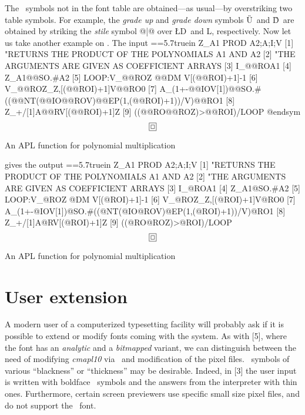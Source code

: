 The \APL\ symbols not in the font table are obtained---as usual---by
overstriking two table symbols.
%
\begintt
   \newbox\firstchar\newskip\charwidth
   \def\overstrike#1#2{\setbox\firstchar=\hbox{#1}\charwidth=\wd\firstchar
                       #1\hskip-\charwidth#2}
\endtt
{}%
For example, the {\it grade up\/} and {\it grade down\/} symbols
\G U\ and \G D\ are obtained by striking the {\it stile\/} symbol
@|@ over \L D\ and \D L, respectively.
%
\begintt
         \def\G#1{\if#1U{\overstrike{\LD}{\AB}}\else      %
                  \if#1D{\overstrike{\DL}{\AB}}\fi\fi}    %
\endtt
Now let us take another example on \APL. The input
\begintt
     =\vbox{\hsize=5.7truein
     \begintt
         [0]   Z_A1 PROD A2;A;I;V
         [1]   "RETURNS THE PRODUCT OF THE POLYNOMIALS A1 AND A2
         [2]   "THE ARGUMENTS ARE GIVEN AS COEFFICIENT ARRAYS
         [3]   I_@@ROA1
         [4]   Z_A1@@SO.#A2
         [5]   LOOP:V_@@ROZ @@DM V[(@@ROI)+1]-1
         [6]   V_@@ROZ_Z,[(@@ROI)+1]V@@RO0
         [7]   A_(1+-@@IOV[1])@@SO.#((@@NT(@@IO@@ROV)@@EP(1,(@@ROI)+1))/V)@@RO1
         [8]   Z_+/[1]A@@RV[(@@ROI)+1]Z
         [9]   ((@@RO@@ROZ)>@@ROI)/LOOP
     @endsym
                    }
     $$\boxit{\boxit{\box0}}$$
     \centerline{\sevenrm An APL function for polynomial multiplication}
\endtt
%
gives the output
%
=\vbox{\hsize=5.7truein
\begintt
      [0]   Z_A1 PROD A2;A;I;V
      [1]   "RETURNS THE PRODUCT OF THE POLYNOMIALS A1 AND A2
      [2]   "THE ARGUMENTS ARE GIVEN AS COEFFICIENT ARRAYS
      [3]   I_@ROA1
      [4]   Z_A1@SO.#A2
      [5]   LOOP:V_@ROZ @DM V[(@ROI)+1]-1
      [6]   V_@ROZ_Z,[(@ROI)+1]V@RO0
      [7]   A_(1+-@IOV[1])@SO.#((@NT(@IO@ROV)@EP(1,(@ROI)+1))/V)@RO1
      [8]   Z_+/[1]A@RV[(@ROI)+1]Z
      [9]   ((@RO@ROZ)>@ROI)/LOOP
\endtt
               }
$$\boxit{\boxit{\box0}}$$
\centerline{\sevenrm An APL function for polynomial multiplication}
%
\section{User extension}
A modern user of a computerized typesetting facility will probably
ask if it is possible to extend or modify fonts coming with the
system. As with [5], where the font has an {\it analytic\/} and a
{\it bitmapped\/} variant, we can distinguish between the need of modifying
{\it cmapl10\/} via \METAFONT\ and modification of the pixel files.
\APL\ symbols of various ``blackness'' or ``thickness'' may be desirable.
Indeed, in [3] the user input is written with boldface \APL\ symbols
and the answers from the interpreter with thin ones. Furthermore,
certain screen previewers use specific small size pixel files, and
do not support the \APL\ font.

